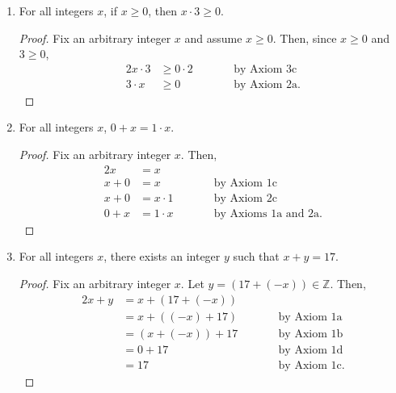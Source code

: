 \documentclass{article}
\begin{document}
\begin{enumerate}
\begin{enumerate}
    			\item For all integers $x$, if $x \ge 0$, then $x \cdot 3 \ge 0$.
                        \begin{proof}
                            Fix an arbitrary integer $x$ and assume $x \ge 0$. Then, since $x \ge 0$ and $3 \ge 0$,
                            \begin{alignat*}{2}
                                x \cdot 3 &\ge 0 \cdot 2    &\qquad &\textrm{by Axiom 3c}   \\
                                3 \cdot x &\ge 0            &\qquad &\textrm{by Axiom 2a.}
                            \end{alignat*}
                        \end{proof}

    			\item For all integers $x$, $0 + x = 1 \cdot x$.
                        \begin{proof}
                            Fix an arbitrary integer $x$. Then,
                            \begin{alignat*}{2}
                                x &= x \\
                                x + 0 &= x                  &\qquad &\textrm{by Axiom 1c}   \\
                                x + 0 &= x \cdot 1          &\qquad &\textrm{by Axiom 2c}   \\
                                0 + x &= 1 \cdot x          &\qquad &\textrm{by Axioms 1a and 2a.}
                            \end{alignat*}
                        \end{proof}

    			\item For all integers $x$, there exists an integer $y$ such that $x + y = 17$.
                        \begin{proof}
                            Fix an arbitrary integer $x$. Let $y = (17 + (\minus x)) \in \mathbb{Z}$. Then, 
                            \begin{alignat*}{2}
                                x + y &= x + (17 + (\minus x)) \\
                                &= x + ((\minus x ) + 17)   &\qquad &\textrm{by Axiom 1a}   \\
                                &= (x + (\minus x)) + 17    &\qquad &\textrm{by Axiom 1b}   \\
                                &= 0 + 17                   &\qquad &\textrm{by Axiom 1d}   \\
                                &= 17                       &\qquad &\textrm{by Axiom 1c.}  
                            \end{alignat*}
                        \end{proof}


\end{enumerate}
\end{enumerate}
\end{document}
